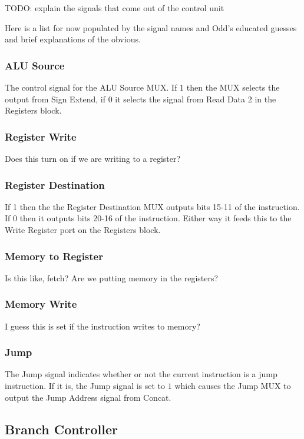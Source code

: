 TODO: explain the signals that come out of the control unit

Here is a list for now populated by the signal names and Odd's educated guesses and brief explanations of the obvious.

\subsubsection{ALU Source}
The control signal for the ALU Source MUX. If 1 then the MUX selects the output from Sign Extend, if 0 it selects the signal from Read Data 2 in the Registers block.

\subsubsection{Register Write}
Does this turn on if we are writing to a register?

\subsubsection{Register Destination}
If 1 then the the Register Destination MUX outputs bits 15-11 of the instruction. If 0 then it outputs bits 20-16 of the instruction. Either way it feeds this to the Write Register port on the Registers block.

\subsubsection{Memory to Register}
Is this like, fetch? Are we putting memory in the registers?

\subsubsection{Memory Write}
I guess this is set if the instruction writes to memory?

\subsubsection{Jump}
The Jump signal indicates whether or not the current instruction is a jump instruction. If it is, the Jump signal is set to $1$ which causes the Jump MUX to output the Jump Address signal from Concat.

\subsection{Branch Controller}

